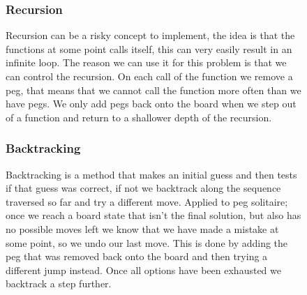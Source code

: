 \documentclass[11pt]{article}
\begin{document}
\begin{figure}
\subsubsection*{Recursion}
Recursion can be a risky concept to implement, the idea is that the functions at some point calls itself, this can very easily result in an infinite loop. The reason we can use it for this problem is that we can control the recursion. On each call of the function we remove a peg, that means that we cannot call the function more often than we have pegs. We only add pegs back onto the board when we step out of a function and return to a shallower depth of the recursion.
\end{figure}
\begin{figure}

\subsubsection*{Backtracking}
Backtracking is a method that makes an initial guess and then tests if that guess was correct, if not we backtrack along the sequence traversed so far and try a different move. 
Applied to peg solitaire; once we reach a board state that isn't the final solution, but also has no possible moves left we know that we have made a mistake at some point, so we undo our last move. This is done by adding the peg that was removed back onto the board and then trying a different jump instead. Once all options have been exhausted we backtrack a step further.

\end{figure}
\end{document}
